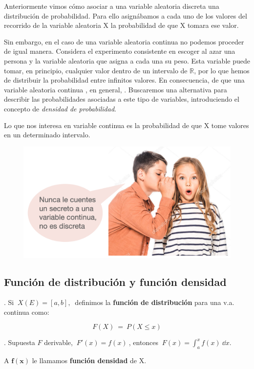 Anteriormente vimos cómo asociar a una variable aleatoria discreta una distribución de probabilidad. Para ello asignábamos a cada uno de los valores del recorrido de la variable aleatoria X la probabilidad de que X tomara ese valor.

Sin embargo, en el caso de una variable aleatoria continua no podemos proceder de igual manera. Considera el experimento consistente en escoger al azar una persona y la variable aleatoria que asigna a cada una su peso. Esta variable puede tomar, en principio, cualquier valor dentro de un intervalo de $\mathbb R$, por lo que hemos de distribuir la probabilidad entre infinitos valores. En consecuencia,  de que una variable aleatoria continua , en general, . Buscaremos una alternativa para describir las probabilidades asociadas a este tipo de variables, introduciendo el concepto de \emph{densidad de probabilidad}.

Lo que nos interesa en variable continua es la probabilidad de que X tome valores en un determinado intervalo.

	\begin{figure}[H]
	\centering
	\includegraphics[width=.6\textwidth]{imagenes/imagenes04/T04IM07.png}
	\end{figure}


\subsection{Función de distribución y función densidad}

\begin{definition}
.	Si $\ X(E)=[a,b],\ $ definimos	la \textbf{función de distribución} para una v.a. continua como:

$$F(X)\ = \ P(X\le x)$$
\end{definition}

\begin{definition}
.	Supuesta $F$ derivable, $\ F'(x)=f(x) \ $, entonces $\ F(x)=\displaystyle \int_a^x f(x) \ \dd x$.

A $\boldsymbol {f(x)}$ le llamamos \textbf{función densidad} de X.
\end{definition}


